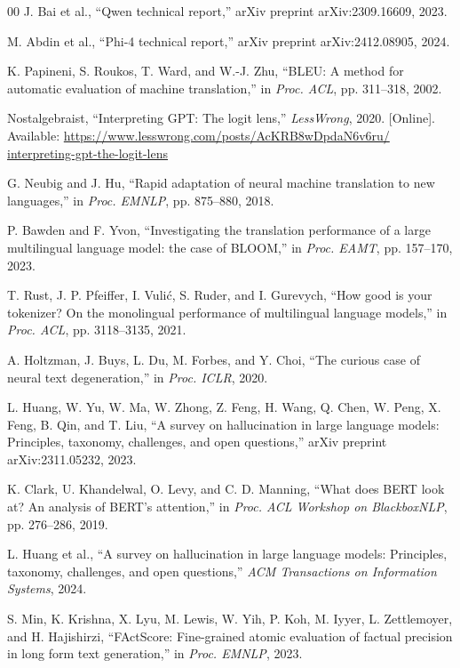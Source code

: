 \documentclass[conference]{IEEEtran}
\begin{document}
\begin{thebibliography}{00}
J. Bai et al., ``Qwen technical report,'' arXiv preprint 
arXiv:2309.16609, 2023.

M. Abdin et al., ``Phi-4 technical report,'' arXiv 
preprint arXiv:2412.08905, 2024.

K. Papineni, S. Roukos, T. Ward, and W.-J. Zhu, ``BLEU: 
A method for automatic evaluation of machine translation,'' 
in \emph{Proc. ACL}, pp. 311--318, 2002.

Nostalgebraist, ``Interpreting GPT: The logit lens,'' 
\emph{LessWrong}, 2020. [Online]. Available: 
\url{https://www.lesswrong.com/posts/AcKRB8wDpdaN6v6ru/
interpreting-gpt-the-logit-lens}

G. Neubig and J. Hu, ``Rapid adaptation of neural machine 
translation to new languages,'' in \emph{Proc. EMNLP}, 
pp. 875--880, 2018.

P. Bawden and F. Yvon, ``Investigating the translation 
performance of a large multilingual language model: the 
case of BLOOM,'' in \emph{Proc. EAMT}, pp. 157--170, 2023.

T. Rust, J. P. Pfeiffer, I. Vuli\'{c}, S. Ruder, and 
I. Gurevych, ``How good is your tokenizer? On the 
monolingual performance of multilingual language models,'' 
in \emph{Proc. ACL}, pp. 3118--3135, 2021.

A. Holtzman, J. Buys, L. Du, M. Forbes, and Y. Choi, 
``The curious case of neural text degeneration,'' in 
\emph{Proc. ICLR}, 2020.

L. Huang, W. Yu, W. Ma, W. Zhong, Z. Feng, H. Wang, 
Q. Chen, W. Peng, X. Feng, B. Qin, and T. Liu, ``A survey 
on hallucination in large language models: Principles, 
taxonomy, challenges, and open questions,'' arXiv preprint 
arXiv:2311.05232, 2023.

K. Clark, U. Khandelwal, O. Levy, and C. D. Manning, 
``What does BERT look at? An analysis of BERT's 
attention,'' in \emph{Proc. ACL Workshop on BlackboxNLP}, 
pp. 276--286, 2019.

L. Huang et al., ``A survey on hallucination in large 
language models: Principles, taxonomy, challenges, and 
open questions,'' \emph{ACM Transactions on Information 
Systems}, 2024.

S. Min, K. Krishna, X. Lyu, M. Lewis, W. Yih, P. Koh, 
M. Iyyer, L. Zettlemoyer, and H. Hajishirzi, ``FActScore: 
Fine-grained atomic evaluation of factual precision in 
long form text generation,'' in \emph{Proc. EMNLP}, 2023.


\end{thebibliography}
\end{document}

